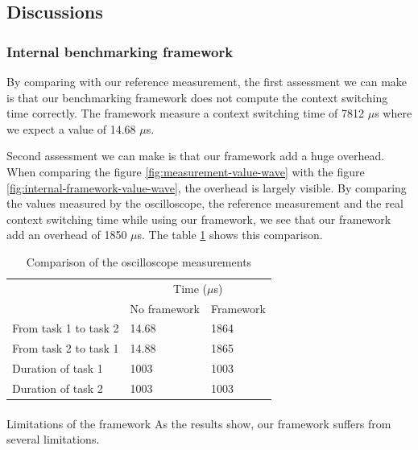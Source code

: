 \subsection{Discussions}

\subsubsection{Internal benchmarking framework}

By comparing with our reference measurement, the first assessment we can make is that our benchmarking framework does not compute the context switching time correctly.
The framework measure a context switching time of 7812 $\mu$s where we expect a value of 14.68 $\mu$s.

Second assessment we can make is that our framework add a huge overhead.
When comparing the figure \ref{fig:measurement-value-wave} with the figure \ref{fig:internal-framework-value-wave}, the overhead is largely visible.
By comparing the values measured by the oscilloscope, the reference measurement and the real context switching time while using our framework, we see that our framework add an overhead of 1850 $\mu$s.
The table \ref{tab:measurements-comparison} shows this comparison.

\begin{table}[!ht]
  \centering
  \begin{tabular}{lll}
                        & \multicolumn{2}{c}{Time ($\mu$s)}                                     \\ \cline{2-3} 
                        & \multicolumn{1}{c}{No framework} & Framework \\ \cline{2-3} 
  From task 1 to task 2 & 14.68                                     & 1864                  \\
  From task 2 to task 1 & 14.88                                     & 1865                  \\
  Duration of task 1    & 1003                                      & 1003                  \\
  Duration of task 2    & 1003                                      & 1003                 
  \end{tabular}
  \caption{Comparison of the oscilloscope measurements}
  \label{tab:measurements-comparison}
\end{table}

\paragraph{}{Limitations of the framework}
As the results show, our framework suffers from several limitations.

